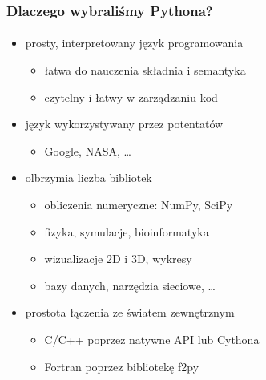 \documentclass{beamer}
\begin{document}
\begin{frame}
    \frametitle{Dlaczego wybraliśmy Pythona?}
    \framesubtitle{}

    \begin{itemize}
        \item prosty, interpretowany język programowania
            \begin{itemize}
                \item łatwa do nauczenia składnia i semantyka
                \item czytelny i łatwy w zarządzaniu kod
            \end{itemize}
            \pause
        \item język wykorzystywany przez potentatów
            \begin{itemize}
                \item Google, NASA, \ldots
            \end{itemize}
            \pause
        \item olbrzymia liczba bibliotek
            \begin{itemize}
                \item obliczenia numeryczne: NumPy, SciPy
                \item fizyka, symulacje, bioinformatyka
                \item wizualizacje 2D i 3D, wykresy
                \item bazy danych, narzędzia sieciowe, \ldots
            \end{itemize}
            \pause
        \item prostota łączenia ze światem zewnętrznym
            \begin{itemize}
                \item C/C++ poprzez natywne API lub Cythona
                \item Fortran poprzez bibliotekę f2py
            \end{itemize}
    \end{itemize}
\end{frame}
\end{document}
